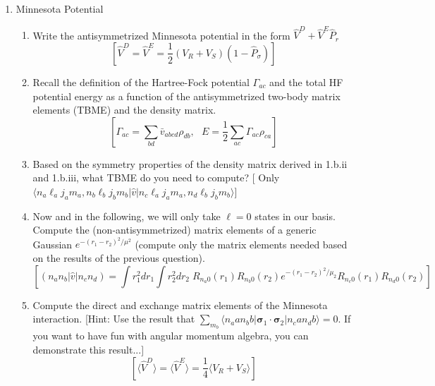 \documentclass[letterpaper,11pt]{article}
\newcommand{\gras}[1]{\boldsymbol{#1}}
\begin{document}
\begin{enumerate}
\item Minnesota Potential
\begin{enumerate}
\item Write the antisymmetrized Minnesota potential in the form $\hat{V}^{D} + \hat{V}^{E}\hat{P}_{r}$\
$$
[
\hat{V}^{D} = \hat{V}^{E} = \frac{1}{2} ( V_{R} + V_{S} )(1 - \hat{P}_{\sigma})
]
$$
\item Recall the definition of the Hartree-Fock potential $\Gamma_{ac}$ and the total HF potential energy as a function of the antisymmetrized two-body matrix elements (TBME) and the density matrix.
$$
[
\Gamma_{ac} = \sum_{bd} \bar{v}_{abcd}\rho_{db},\ \ \ E = \frac{1}{2}\sum_{ac} \Gamma_{ac}\rho_{ca}
]
$$
\item Based on the symmetry properties of the density matrix derived in 1.b.ii and 1.b.iii, what TBME do you need to compute?
[ Only $\langle n_{a} \ell_{a} j_{a} m_{a}, n_{b} \ell_{b} j_{b} m_{b} |\hat{v} | n_{c} \ell_{a} j_{a} m_{a}, n_{d}\ell_{b} j_{b} m_{b} \rangle$]
\item Now and in the following, we will only take $\ell = 0$ states in our basis. Compute the (non-antisymmetrized) matrix elements of a generic Gaussian $e^{-(r_{1} - r_{2})^{2}/\mu^{2}}$ (compute only the matrix elements needed based on the results of the previous question).
$$
[
( n_{a} n_{b} |\hat{v} | n_{c}  n_{d} )
=
\int r_{1}^{2}dr_{1} \int r_{2}^{2}dr_{2}\; 
R_{n_{a}0}(r_{1})R_{n_{b}0}(r_{2})
e^{-(r_{1} - r_{2})^{2}/\mu_{2}}
R_{n_{c}0}(r_{1})R_{n_{d}0}(r_{2})
]
$$
\item Compute the direct and exchange matrix elements of the Minnesota interaction. [Hint: Use the result that $ \sum_{m_{b}} \langle n_{a} a n_{b}b | \gras{\sigma}_{1}\cdot\gras{\sigma}_{2} | n_{c}a n_{d}b\rangle = 0 $. If you want to have fun with angular momentum algebra, you can demonstrate this result...]
$$
[
\langle \hat{V}^{D} \rangle = \langle \hat{V}^{E} \rangle = \frac{1}{4} \langle V_{R} + V_{S} \rangle
]
$$
\end{enumerate}
\end{enumerate}
\end{document}
